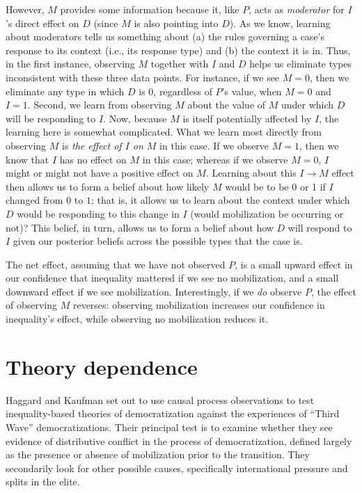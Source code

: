 \documentclass[
  12pt,
]{book}
\begin{document}
However, \(M\) provides some information because it, like \(P\), acts as \emph{moderator} for \(I\)'s direct effect on \(D\) (since \(M\) is also pointing into \(D\)). As we know, learning about moderators tells us something about (a) the rules governing a case's response to its context (i.e., its response type) and (b) the context it is in. Thus, in the first instance, observing \(M\) together with \(I\) and \(D\) helps us eliminate types inconsistent with these three data points. For instance, if we see \(M=0\), then we eliminate any type in which \(D\) is 0, regardless of \(P\)'s value, when \(M=0\) and \(I=1\). Second, we learn from observing \(M\) about the value of \(M\) under which \(D\) will be responding to \(I\). Now, because \(M\) is itself potentially affected by \(I\), the learning here is somewhat complicated. What we learn most directly from observing \(M\) is \emph{the effect of \(I\) on \(M\)} in this case. If we observe \(M=1\), then we know that \(I\) has no effect on \(M\) in this case; whereas if we observe \(M=0\), \(I\) might or might not have a positive effect on \(M\). Learning about this \(I \rightarrow M\) effect then allows us to form a belief about how likely \(M\) would be to be 0 or 1 if \(I\) changed from \(0\) to \(1\); that is, it allows us to learn about the context under which \(D\) would be responding to this change in \(I\) (would mobilization be occurring or not)? This belief, in turn, allows us to form a belief about how \(D\) will respond to \(I\) given our posterior beliefs across the possible types that the case is.

The net effect, assuming that we have not observed \(P\), is a small upward effect in our confidence that inequality mattered if we see no mobilization, and a small downward effect if we see mobilization. Interestingly, if we \emph{do} observe \(P\), the effect of observing \(M\) reverses: observing mobilization increases our confidence in inequality's effect, while observing no mobilization reduces it.

\hypertarget{theory-dependence}{%
\section{Theory dependence}\label{theory-dependence}}

Haggard and Kaufman set out to use causal process observations to test inequality-based theories of democratization against the experiences of ``Third Wave'' democratizations. Their principal test is to examine whether they see evidence of distributive conflict in the process of democratization, defined largely as the presence or absence of mobilization prior to the transition. They secondarily look for other possible causes, specifically international pressure and splits in the elite.
\end{document}
